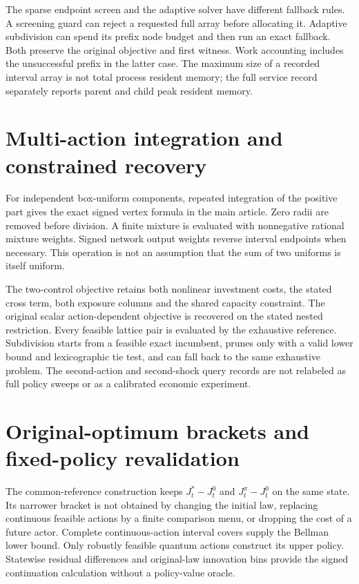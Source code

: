 The sparse endpoint screen and the adaptive solver have different fallback rules. A screening guard can reject a requested full array before allocating it. Adaptive subdivision can spend its prefix node budget and then run an exact fallback. Both preserve the original objective and first witness. Work accounting includes the unsuccessful prefix in the latter case. The maximum size of a recorded interval array is not total process resident memory; the full service record separately reports parent and child peak resident memory.

\section{Multi-action integration and constrained recovery}\label{supp:multi61}

For independent box-uniform components, repeated integration of the positive part gives the exact signed vertex formula in the main article. Zero radii are removed before division. A finite mixture is evaluated with nonnegative rational mixture weights. Signed network output weights reverse interval endpoints when necessary. This operation is not an assumption that the sum of two uniforms is itself uniform.

The two-control objective retains both nonlinear investment costs, the stated cross term, both exposure columns and the shared capacity constraint. The original scalar action-dependent objective is recovered on the stated nested restriction. Every feasible lattice pair is evaluated by the exhaustive reference. Subdivision starts from a feasible exact incumbent, prunes only with a valid lower bound and lexicographic tie test, and can fall back to the same exhaustive problem. The second-action and second-shock query records are not relabeled as full policy sweeps or as a calibrated economic experiment.

\section{Original-optimum brackets and fixed-policy revalidation}\label{supp:fixed61}
The common-reference construction keeps $J_t^*-J_t^0$ and $J_t^\pi-J_t^0$ on the same state. Its narrower bracket is not obtained by changing the initial law, replacing continuous feasible actions by a finite comparison menu, or dropping the cost of a future actor. Complete continuous-action interval covers supply the Bellman lower bound. Only robustly feasible quantum actions construct its upper policy. Statewise residual differences and original-law innovation bins provide the signed continuation calculation without a policy-value oracle.

